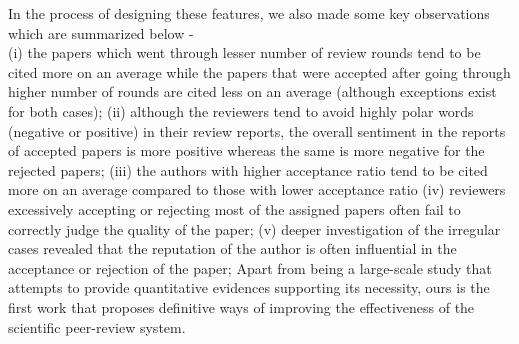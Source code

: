 In the process of designing these features, we also made some key observations which are summarized below - \\ 
(i) the papers which went through lesser number of review rounds tend to be cited more on an average while the papers that were accepted after going through higher number of rounds are cited less on an average (although exceptions exist for both cases); 
(ii) although the reviewers tend to avoid highly polar words (negative or positive) in their review reports, the overall sentiment in the reports of accepted papers is more positive whereas the same is more negative for the rejected papers; 
(iii) the authors with higher acceptance ratio tend to be cited more on an average compared to those with lower acceptance ratio 
(iv) reviewers excessively accepting or rejecting most of the assigned papers often fail to correctly judge the quality of the paper;
(v) deeper investigation of the irregular cases revealed that the reputation of the author is often influential in the acceptance or rejection of the paper;
Apart from being a large-scale study that attempts to provide quantitative evidences supporting its necessity, ours is the first work that proposes definitive ways of improving the effectiveness of the scientific peer-review system.  



